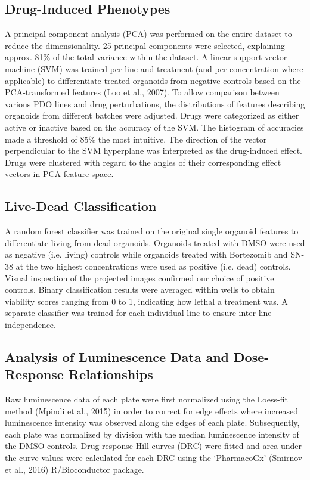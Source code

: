 \begin{flushleft}
\subsection{Drug-Induced Phenotypes}
A principal component analysis (PCA) was performed on the entire dataset to reduce the dimensionality. 25 principal components were selected, explaining approx. 81\% of the total variance within the dataset. A linear support vector machine (SVM) was trained per line and treatment (and per concentration where applicable) to differentiate treated organoids from negative controls based on the PCA-transformed features (Loo et al., 2007). To allow comparison between various PDO lines and drug perturbations, the distributions of features describing organoids from different batches were adjusted. Drugs were categorized as either active or inactive based on the accuracy of the SVM. The histogram of accuracies made a threshold of 85\% the most intuitive. The direction of the vector perpendicular to the SVM hyperplane was interpreted as the drug-induced effect. Drugs were clustered with regard to the angles of their corresponding effect vectors in PCA-feature space.

\subsection{Live-Dead Classification}
A random forest classifier was trained on the original single organoid features to differentiate living from dead organoids. Organoids treated with DMSO were used as negative (i.e. living) controls while organoids treated with Bortezomib and SN-38 at the two highest concentrations were used as positive (i.e. dead) controls. Visual inspection of the projected images confirmed our choice of positive controls. Binary classification results were averaged within wells to obtain viability scores ranging from 0 to 1, indicating how lethal a treatment was. A separate classifier was trained for each individual line to ensure inter-line independence.

\subsection{Analysis of Luminescence Data and Dose-Response Relationships}
Raw luminescence data of each plate were first normalized using the Loess-fit method
(Mpindi et al., 2015) in order to correct for edge effects where increased luminescence intensity was observed along the edges of each plate. Subsequently, each plate was normalized by division with the median luminescence intensity of the DMSO controls. Drug response Hill curves (DRC) were fitted and area under the curve values were calculated for each DRC using the ‘PharmacoGx’ (Smirnov et al., 2016) R/Bioconductor package.

\end{flushleft}
